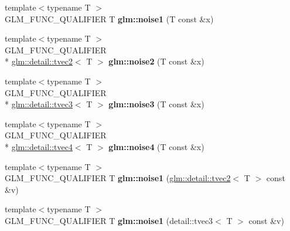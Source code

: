 \begin{DoxyCompactItemize}
\item 
\hypertarget{namespaceglm_a46b13094895146ed855baa444f5b13a2}{{\footnotesize template$<$typename T $>$ }\\G\-L\-M\-\_\-\-F\-U\-N\-C\-\_\-\-Q\-U\-A\-L\-I\-F\-I\-E\-R T {\bfseries glm\-::noise1} (T const \&x)}\label{namespaceglm_a46b13094895146ed855baa444f5b13a2}

\item 
\hypertarget{namespaceglm_a537b52cd11e23488fdb340b14e230d6a}{{\footnotesize template$<$typename T $>$ }\\G\-L\-M\-\_\-\-F\-U\-N\-C\-\_\-\-Q\-U\-A\-L\-I\-F\-I\-E\-R \\*
\hyperlink{structglm_1_1detail_1_1tvec2}{glm\-::detail\-::tvec2}$<$ T $>$ {\bfseries glm\-::noise2} (T const \&x)}\label{namespaceglm_a537b52cd11e23488fdb340b14e230d6a}

\item 
\hypertarget{namespaceglm_a93f45a95a1a28541fd1bc7eca43861dd}{{\footnotesize template$<$typename T $>$ }\\G\-L\-M\-\_\-\-F\-U\-N\-C\-\_\-\-Q\-U\-A\-L\-I\-F\-I\-E\-R \\*
\hyperlink{structglm_1_1detail_1_1tvec3}{glm\-::detail\-::tvec3}$<$ T $>$ {\bfseries glm\-::noise3} (T const \&x)}\label{namespaceglm_a93f45a95a1a28541fd1bc7eca43861dd}

\item 
\hypertarget{namespaceglm_aaa8ec09066d07f381c26788fa673d1c5}{{\footnotesize template$<$typename T $>$ }\\G\-L\-M\-\_\-\-F\-U\-N\-C\-\_\-\-Q\-U\-A\-L\-I\-F\-I\-E\-R \\*
\hyperlink{structglm_1_1detail_1_1tvec4}{glm\-::detail\-::tvec4}$<$ T $>$ {\bfseries glm\-::noise4} (T const \&x)}\label{namespaceglm_aaa8ec09066d07f381c26788fa673d1c5}

\item 
\hypertarget{namespaceglm_ab95a02ef03c4ecae418d18841046aebb}{{\footnotesize template$<$typename T $>$ }\\G\-L\-M\-\_\-\-F\-U\-N\-C\-\_\-\-Q\-U\-A\-L\-I\-F\-I\-E\-R T {\bfseries glm\-::noise1} (\hyperlink{structglm_1_1detail_1_1tvec2}{glm\-::detail\-::tvec2}$<$ T $>$ const \&v)}\label{namespaceglm_ab95a02ef03c4ecae418d18841046aebb}

\item 
\hypertarget{namespaceglm_a6d0c178ef88d9dbdba8c16d733c2f2a9}{{\footnotesize template$<$typename T $>$ }\\G\-L\-M\-\_\-\-F\-U\-N\-C\-\_\-\-Q\-U\-A\-L\-I\-F\-I\-E\-R T {\bfseries glm\-::noise1} (detail\-::tvec3$<$ T $>$ const \&v)}\label{namespaceglm_a6d0c178ef88d9dbdba8c16d733c2f2a9}


\end{DoxyCompactItemize}
